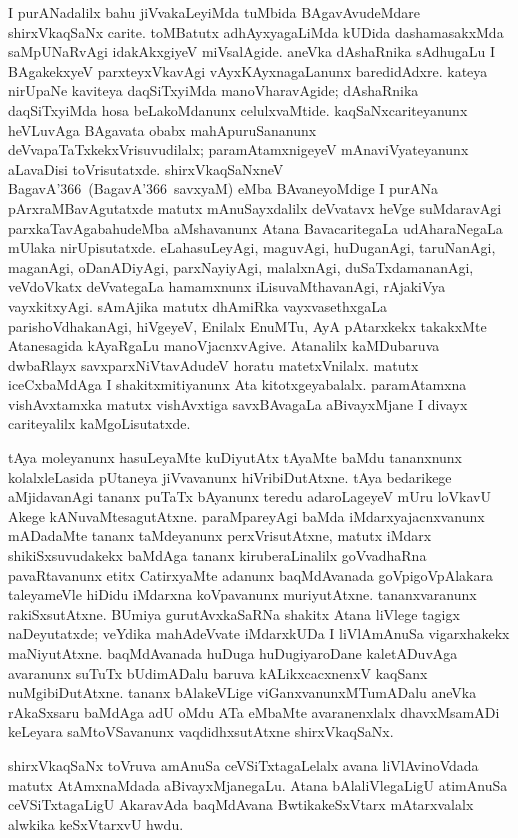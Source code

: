 I purANadalilx bahu jiVvakaLeyiMda tuMbida BAgavAvudeMdare shirxVkaqSaNx carite. toMBatutx adhAyxyagaLiMda kUDida dashamasakxMda saMpUNaRvAgi idakAkxgiyeV miVsa\-lAgide. aneVka dAshaRnika sAdhugaLu I BAgakekxyeV parxteyxVkavAgi vAyxKAyxnagaLanunx baredidAdxre. kateya nirUpaNe kaviteya daqSiTxyiMda manoVharavAgide; dAshaRnika daqSiTxyiMda hosa beLakoMdanunx celulxvaMtide. kaqSaNxcariteyanunx heVLuvAga BAga\-vata obabx mahApuruSananunx deVvapaTaTxkekxVrisuvudilalx; paramAtamxnigeyeV mAnaviVyate\-yanunx aLavaDisi toVrisutatxde. shirxVkaqSaNxneV BagavA\char'366\ (BagavA\char'366\ savxyaM) eMba BAvaneyoMdige I purANa pArxraMBavAgutatxde matutx mAnuSayxdalilx deVvatavx heVge suMdaravAgi parxkaTavAgabahudeMba aMshavanunx Atana BavacaritegaLa udAharaNegaLa mUlaka nirUpisutatxde. eLahasuLeyAgi, maguvAgi, huDuganAgi, taruNanAgi, maganAgi, oDanADiyAgi, parxNayiyAgi, malalxnAgi, duSaTxdamananAgi, veVdoVkatx deVvategaLa hamamxnunx iLisuvaMthavanAgi, rAjakiVya vayxkitxyAgi. sAmAjika matutx dhAmiRka vayxvasethxgaLa parishoVdhakanAgi, hiVgeyeV, Enilalx EnuMTu, AyA pAtarxkekx takakxMte Atanesagida kAyaRgaLu manoVjacnxvAgive. Atanalilx kaMDubaruva dwbaRlayx savxparxNiVtavAdudeV horatu matetxVnilalx. matutx iceCxbaMdAga I shakitxmitiyanunx Ata kitotxgeyabalalx. paramAtamxna vishAvxtamxka matutx vishAvxtiga savxBAvagaLa aBivayxMjane I divayx cariteyalilx kaMgoLisutatxde.

tAya moleyanunx hasuLeyaMte kuDiyutAtx tAyaMte baMdu tananxnunx kolalx\-leLasida pUtaneya jiVvavanunx hiVribiDutAtxne. tAya bedarikege aMjidavanAgi tananx puTaTx bAyanunx teredu adaroLageyeV mUru loVkavU Akege kANuvaMtesagutAtxne. paraMpareyAgi baMda iMdarxyajacnxvanunx mADadaMte tananx taMdeyanunx perxVrisutAtxne, matutx iMdarx shikiSxsuvudakekx baMdAga tananx kiruberaLinalilx goVvadhaRna pavaRtavanunx etitx CatirxyaMte adanunx baqMdAvanada goVpigoVpAlakara taleyameVle hiDidu iMdarxna koVpavanunx muriyutAtxne. tananxvaranunx rakiSxsutAtxne. BUmiya gurutAvxkaSaRNa shakitx Atana liVlege tagigx naDeyutatxde; veYdika mahAdeVvate iMdarxkUDa I liVlAmAnuSa vigarxhakekx maNiyutAtxne. baqMdAvanada huDuga huDugiyaroDane kaletADuvAga avaranunx suTuTx bUdimADalu baruva kALikxcacxnenxV kaqSanx nuMgibiDutAtxne. tananx bAlakeVLige viGanxvanunxMTumADalu aneVka rAkaSxsaru baMdAga adU oMdu ATa eMbaMte avaranenxlalx dhavxMsamADi keLeyara saMtoVSavanunx vaqdidhxsutAtxne shirxVkaqSaNx.

shirxVkaqSaNx toVruva amAnuSa ceVSiTxtagaLelalx avana liVlAvinoVdada matutx AtAmxnaMdada aBivayxMjanegaLu. Atana bAlaliVlegaLigU atimAnuSa ceVSiTxtagaLigU AkaravAda baqMdAvana BwtikakeSxVtarx mAtarxvalalx alwkika keSxVtarxvU hwdu.

